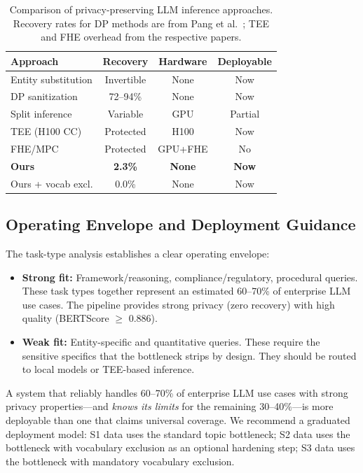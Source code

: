 \documentclass[sigconf,anonymous,review,balance=false]{acmart}
\begin{document}
\begin{table}[t]
\caption{Comparison of privacy-preserving LLM inference approaches. Recovery rates for DP methods are from Pang et al.~\cite{pang2024}; TEE and FHE overhead from the respective papers.}
\label{tab:comparison}
\begin{tabular}{lccc}
\toprule
\textbf{Approach} & \textbf{Recovery} & \textbf{Hardware} & \textbf{Deployable} \\
\midrule
Entity substitution & Invertible & None & Now \\
DP sanitization & 72--94\% & None & Now \\
Split inference & Variable & GPU & Partial \\
TEE (H100 CC) & Protected & H100 & Now \\
FHE/MPC & Protected & GPU+FHE & No \\
\textbf{Ours} & \textbf{2.3\%} & \textbf{None} & \textbf{Now} \\
Ours + vocab excl. & 0.0\% & None & Now \\
\bottomrule
\end{tabular}
\end{table}

\subsection{Operating Envelope and Deployment Guidance}
\label{sec:envelope}

The task-type analysis establishes a clear operating envelope:

\begin{itemize}
\item \textbf{Strong fit:} Framework/reasoning, compliance/regulatory, procedural queries. These task types together represent an estimated 60--70\% of enterprise LLM use cases. The pipeline provides strong privacy (zero recovery) with high quality (BERTScore $\geq$ 0.886).
\item \textbf{Weak fit:} Entity-specific and quantitative queries. These require the sensitive specifics that the bottleneck strips by design. They should be routed to local models or TEE-based inference.
\end{itemize}

A system that reliably handles 60--70\% of enterprise LLM use cases with strong privacy properties---and \emph{knows its limits} for the remaining 30--40\%---is more deployable than one that claims universal coverage. We recommend a graduated deployment model: S1 data uses the standard topic bottleneck; S2 data uses the bottleneck with vocabulary exclusion as an optional hardening step; S3 data uses the bottleneck with mandatory vocabulary exclusion.
\end{document}
